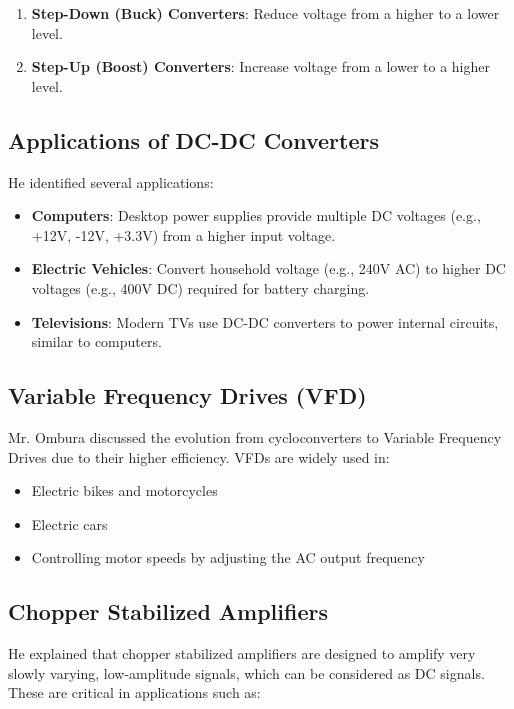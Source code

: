 \documentclass[a4paper,9pt,twoside,openany,twocolumn]{memoir}
\begin{document}
\begin{enumerate}
    \item \textbf{Step-Down (Buck) Converters}: Reduce voltage from a higher to a lower level.
    \item \textbf{Step-Up (Boost) Converters}: Increase voltage from a lower to a higher level.
\end{enumerate}

\subsection{Applications of DC-DC Converters}

He identified several applications:

\begin{itemize}
    \item \textbf{Computers}: Desktop power supplies provide multiple DC voltages (e.g., +12V, -12V, +3.3V) from a higher input voltage.
    \item \textbf{Electric Vehicles}: Convert household voltage (e.g., 240V AC) to higher DC voltages (e.g., 400V DC) required for battery charging.
    \item \textbf{Televisions}: Modern TVs use DC-DC converters to power internal circuits, similar to computers.
\end{itemize}

\subsection{Variable Frequency Drives (VFD)}

Mr. Ombura discussed the evolution from cycloconverters to Variable Frequency Drives due to their higher efficiency. VFDs are widely used in:

\begin{itemize}
    \item Electric bikes and motorcycles
    \item Electric cars
    \item Controlling motor speeds by adjusting the AC output frequency
\end{itemize}

\subsection{Chopper Stabilized Amplifiers}

He explained that chopper stabilized amplifiers are designed to amplify very slowly varying, low-amplitude signals, which can be considered as DC signals. These are critical in applications such as:
\end{document}
